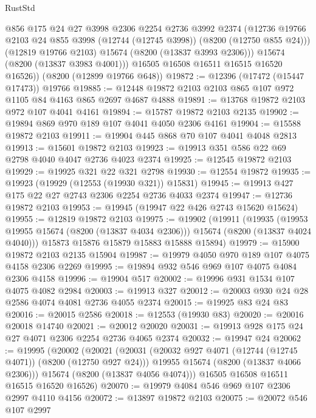 \begin{lexlean}{RustStd}
\begin{coremodule}
            @856
            @175
            @24
            @27
            @3998
            @2306
            @2254
            @2736
            @3992
            @2374
            (@12736 @19766 @2103 @24 @855 @3998 (@12744 (@12745 @3998)) (@8200 (@12750 @855 @24)))
            (@12819 @19766 @2103)
            @15674
            (@8200 (@13837 @3993 @2306)))
          @15674
          (@8200 (@13837 @3983 @4001)))
        @16505
        @16508
        @16511
        @16515
        @16520
        @16526))
    (@8200 (@12899 @19766 @648))
@19872 := @12396 (@17472 (@15447 @17473)) @19766
@19885 := @12448 @19872 @2103 @2103 @865 @107 @972 @1105 @84 @4163 @865 @2697 @4687 @4888
@19891 := @13768 @19872 @2103 @972 @107 @4041 @4161
@19894 := @15787 @19872 @2103 @2135
@19902 := @19894 @869 @970 @189 @107 @4041 @4050 @2306 @4161
@19904 := @15588 @19872 @2103
@19911 := @19904 @445 @868 @70 @107 @4041 @4048 @2813
@19913 := @15601 @19872 @2103
@19923 := @19913 @351 @586 @22 @69 @2798 @4040 @4047 @2736 @4023 @2374
@19925 := @12545 @19872 @2103
@19929 := @19925 @321 @22 @321 @2798
@19930 := @12554 @19872
@19935 := @19923 (@19929 (@12553 (@19930 @321)) @15831)
@19945 := @19913 @427 @175 @22 @27 @2743 @2306 @2254 @2736 @4033 @2374
@19947 := @12736 @19872 @2103
@19953 := @19945 (@19947 @22 @426 @2743 @15620 @15624)
@19955 := @12819 @19872 @2103
@19975 := @19902
    (@19911
      (@19935
        (@19953 @19955 @15674 (@8200 (@13837 @4034 @2306)))
        @15674
        (@8200 (@13837 @4024 @4040)))
      @15873
      @15876
      @15879
      @15883
      @15888
      @15894)
@19979 := @15900 @19872 @2103 @2135 @15904
@19987 := @19979 @4050 @970 @189 @107 @4075 @4158 @2306 @2269
@19995 := @19894 @932 @546 @969 @107 @4075 @4084 @2306 @4158
@19996 := @19904 @517
@20002 := @19996 @931 @1534 @107 @4075 @4082 @2984
@20003 := @19913 @327
@20012 := @20003 @930 @24 @28 @2586 @4074 @4081 @2736 @4055 @2374
@20015 := @19925 @83 @24 @83
@20016 := @20015 @2586
@20018 := @12553 (@19930 @83)
@20020 := @20016 @20018 @14740
@20021 := @20012 @20020
@20031 := @19913 @928 @175 @24 @27 @4071 @2306 @2254 @2736 @4065 @2374
@20032 := @19947 @24
@20062 := @19995
    (@20002
      (@20021
        (@20031
          (@20032 @927 @4071 (@12744 (@12745 @4071)) (@8200 (@12750 @927 @24)))
          @19955
          @15674
          (@8200 (@13837 @4066 @2306)))
        @15674
        (@8200 (@13837 @4056 @4074)))
      @16505
      @16508
      @16511
      @16515
      @16520
      @16526)
@20070 := @19979 @4084 @546 @969 @107 @2306 @2997 @4110 @4156
@20072 := @13897 @19872 @2103
@20075 := @20072 @546 @107 @2997

\end{coremodule}
\end{lexlean}
